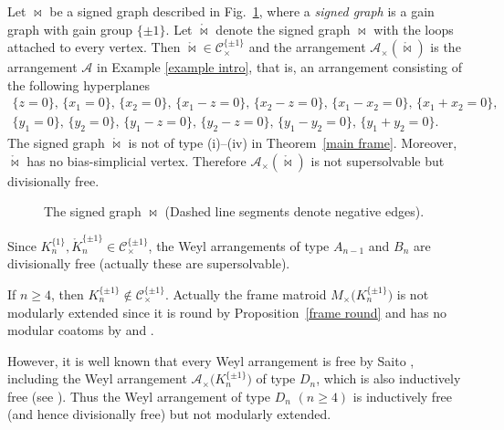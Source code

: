 \documentclass[pdftex]{sigma}
\numberwithin{equation}{section}
\begin{document}
\begin{Example}\label{example frame}
Let $ \bowtie $ be a signed graph described in Fig.~\ref{Fig:bowtie}, where a \textit{signed graph} is a gain graph with gain group $ \{\pm 1\} $.
Let $ \mathring{\bowtie} $ denote the signed graph $ \bowtie $ with the loops attached to every vertex.
Then $ \mathring{\bowtie} \in \mathcal{C}^{\{\pm 1\}}_{\times} $ and the arrangement $ \mathcal{A}_{\times}(\mathring{\bowtie}) $ is the arrangement $ \mathcal{A} $ in Example \ref{example intro}, that is, an arrangement consisting of the following hyperplanes
\begin{gather*}
\{z=0\},\,\{x_{1}=0\},\,\{x_{2}=0\},\,\{x_{1}-z=0\},\,\{x_{2}-z=0\},\,\{x_{1}-x_{2}=0\},\,\{x_{1}+x_{2}=0\}, \\
\{y_{1}=0\},\,\{y_{2}=0\},\,\{y_{1}-z=0\},\,\{y_{2}-z=0\},\,\{y_{1}-y_{2}=0\},\,\{y_{1}+y_{2}=0\}.
\end{gather*}
The signed graph $ \mathring{\bowtie} $ is not of type (i)--(iv) in Theorem~\ref{main frame}.
Moreover, $ \mathring{\bowtie} $ has no bias-simplicial vertex. Therefore $ \mathcal{A}_{\times}(\mathring{\bowtie}) $ is not supersolvable but divisionally free.
\end{Example}

\begin{figure}[t]\centering
{}
\caption{The signed graph $ \bowtie $ (Dashed line segments denote negative edges).}\label{Fig:bowtie}
\end{figure}

\begin{Remark}
Since $ K_{n}^{\{1\}}, \mathring{K}_{n}^{\{\pm 1\}} \in \mathcal{C}_{\times}^{\{\pm 1\}} $, the Weyl arrangements of type $ A_{n-1} $ and $ B_{n} $ are divisionally free (actually these are supersolvable).

If $ n \geq 4 $, then $ K_{n}^{\{\pm 1\}} \not\in \mathcal{C}_{\times}^{\{\pm 1\}} $.
Actually the frame matroid $ M_{\times}\big(K_{n}^{\{\pm 1\}}\big) $ is not modularly extended since it is round by Proposition~\ref{frame round} and has no modular coatoms by \cite[Theorem~2.1]{zaslavsky2001supersolvable-ejoc} and \cite[Theorem~$2.1^{\prime} $]{koban2004comments-ejoc}.

However, it is well known that every Weyl arrangement is free by Saito \cite{saito1977uniformization-rk, saito1980theory-jotfostuotsam}, including the Weyl arrangement $ \mathcal{A}_{\times}\big(K_{n}^{\{\pm 1\}}\big) $ of type $ D_{n} $, which is also inductively free (see \cite[Example~2.6]{jambu1984free-aim}).
Thus the Weyl arrangement of type $ D_{n}$ $(n \geq 4) $ is inductively free (and hence divisionally free) but not modularly extended.
\end{Remark}
\end{document}
